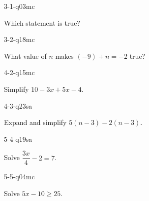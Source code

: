\begin{practiceQuestion}{3-1-q03}{mc}
\begin{questionText}
Which statement is true?
\end{questionText}
\end{practiceQuestion}

\begin{practiceQuestion}{3-2-q18}{mc}
\begin{questionText}
What value of $n$ makes $(-9) + n = -2$ true?
\end{questionText}
\end{practiceQuestion}

\begin{practiceQuestion}{4-2-q15}{mc}
\begin{questionText}
Simplify $10 - 3x + 5x - 4$.
\end{questionText}
\end{practiceQuestion}

\begin{practiceQuestion}{4-3-q23}{sa}
\begin{questionText}
Expand and simplify $5(n - 3) - 2(n - 3)$.
\end{questionText}
\end{practiceQuestion}

\begin{practiceQuestion}{5-4-q19}{sa}
\begin{questionText}
Solve $\dfrac{3x}{4} - 2 = 7$.
\end{questionText}
\end{practiceQuestion}

\begin{practiceQuestion}{5-5-q04}{mc}
\begin{questionText}
Solve $5x - 10 \geq 25$.
\end{questionText}
\end{practiceQuestion}

